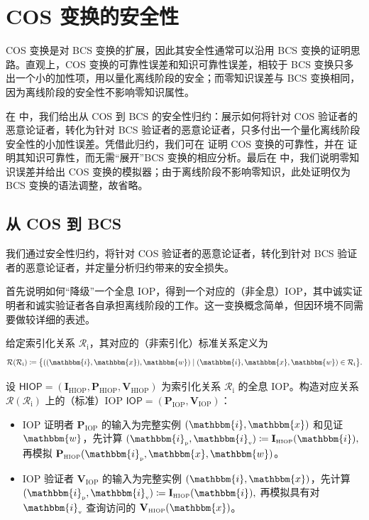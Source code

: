 \documentclass[american,singlepageview]{snargs-book-zh}
\newcommand{\DefineEqual}{\coloneqq}
\newcommand{\Relation}{\mathcal{R}}
\newcommand{\IndexedRelation}{\mathcal{R}_{\mathrm{i}}}
\newcommand{\GetRelation}[1]{\Relation(#1)}
\newcommand{\Index}{\mathbbm{i}}
\newcommand{\Instance}{\mathbbm{x}}
\newcommand{\Witness}{\mathbbm{w}}
\newcommand{\ProtoIndexer}{I}
\newcommand{\ProtoProver}{P}
\newcommand{\ProtoVerifier}{V}
\newcommand{\IOPSymbol}{\mathsf{IOP}}
\newcommand{\IOPSubscript}{\scriptscriptstyle\mathrm{IOP}}
\newcommand{\IOPFormat}[1]{\mathbf{#1}}
\newcommand{\IOPProver}{\IOPFormat{\ProtoProver}_{\IOPSubscript}}
\newcommand{\IOPVerifier}{\IOPFormat{\ProtoVerifier}_{\IOPSubscript}}
\newcommand{\IOPSystem}{(\IOPProver,\IOPVerifier)}
\newcommand{\HIOPSubscript}{\scriptscriptstyle\mathrm{HIOP}}
\newcommand{\HIOPSymbol}{\mathsf{HIOP}}
\newcommand{\HIOPIndexer}{\IOPFormat{\ProtoIndexer}_{\HIOPSubscript}}
\newcommand{\HIOPProver}{\IOPFormat{\ProtoProver}_{\HIOPSubscript}}
\newcommand{\HIOPVerifier}{\IOPFormat{\ProtoVerifier}_{\HIOPSubscript}}
\newcommand{\HIOPSystem}{(\HIOPIndexer,\HIOPProver,\HIOPVerifier)}
\newcommand{\ProverEncodedIndex}{\Index_{{\scriptscriptstyle\mathrm{p}}}}
\newcommand{\VerifierEncodedIndex}{\Index_{{\scriptscriptstyle\mathrm{v}}}}
\begin{document}
\section{COS 变换的安全性}
\label{section:cos-security}

COS 变换是对 BCS 变换的扩展，因此其安全性通常可以沿用 BCS 变换的证明思路。直观上，COS 变换的可靠性误差和知识可靠性误差，相较于 BCS 变换只多出一个小的加性项，用以量化离线阶段的安全；而零知识误差与 BCS 变换相同，因为离线阶段的安全性不影响零知识属性。

在  中，我们给出从 COS 到 BCS 的安全性归约：展示如何将针对 COS 验证者的恶意论证者，转化为针对 BCS 验证者的恶意论证者，只多付出一个量化离线阶段安全性的小加性误差。凭借此归约，我们可在  证明 COS 变换的可靠性，并在  证明其知识可靠性，而无需“展开”BCS 变换的相应分析。最后在  中，我们说明零知识误差并给出 COS 变换的模拟器；由于离线阶段不影响零知识，此处证明仅为 BCS 变换的语法调整，故省略。

\subsection{从 COS 到 BCS}
\label{section:cos-to-bcs}

我们通过安全性归约，将针对 COS 验证者的恶意论证者，转化到针对 BCS 验证者的恶意论证者，并定量分析归约带来的安全损失。

首先说明如何“降级”一个全息 IOP，得到一个对应的（非全息）IOP，其中诚实证明者和诚实验证者各自承担离线阶段的工作。这一变换概念简单，但因环境不同需要做较详细的表述。

\begin{definition}
\label{definition:from-indexed-to-nonindexed}
给定索引化关系 $\IndexedRelation$，其对应的（非索引化）标准关系定义为
\[
  \GetRelation{\IndexedRelation}
  \DefineEqual
  \bigl\{((\Index,\Instance),\Witness)\mid
    (\Index,\Instance,\Witness)\in\IndexedRelation
  \bigr\}.
\]
\end{definition}

\begin{construction}
\label{construction:from-hiop-to-iop}
设 $\HIOPSymbol=\HIOPSystem$ 为索引化关系 $\IndexedRelation$ 的全息 IOP。构造对应关系 $\GetRelation{\IndexedRelation}$ 上的（标准）IOP $\IOPSymbol=\IOPSystem$：
\begin{itemize}[nolistsep]
  \item IOP 证明者 $\IOPProver$ 的输入为完整实例 $(\Index,\Instance)$ 和见证 $\Witness$，先计算
    \(
      (\ProverEncodedIndex,\VerifierEncodedIndex)
        \DefineEqual \HIOPIndexer(\Index),
    \)
    再模拟 $\HIOPProver(\ProverEncodedIndex,\Instance,\Witness)$。
  \item IOP 验证者 $\IOPVerifier$ 的输入为完整实例 $(\Index,\Instance)$，先计算
    \(
      (\ProverEncodedIndex,\VerifierEncodedIndex)
        \DefineEqual \HIOPIndexer(\Index),
    \)
    再模拟具有对 $\VerifierEncodedIndex$ 查询访问的 $\HIOPVerifier(\Instance)$。
\end{itemize}
\end{construction}
\end{document}
